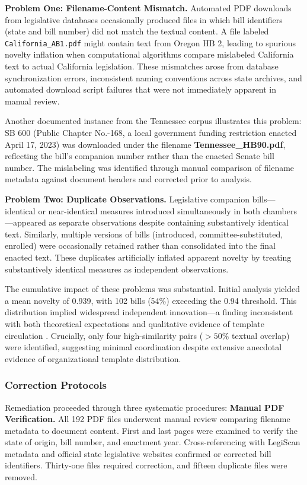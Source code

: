 \textbf{Problem One: Filename-Content Mismatch.} Automated PDF downloads from legislative databases occasionally produced files in which bill identifiers (state and bill number) did not match the textual content. A file labeled \texttt{California\_AB1.pdf} might contain text from Oregon HB 2, leading to spurious novelty inflation when computational algorithms compare mislabeled California text to actual California legislation. These mismatches arose from database synchronization errors, inconsistent naming conventions across state archives, and automated download script failures that were not immediately apparent in manual review.

Another documented instance from the Tennessee corpus illustrates this problem: SB 600 (Public Chapter No.-168, a local government funding restriction enacted April 17, 2023) was downloaded under the filename \textbf{Tennessee\_HB90.pdf}, reflecting the bill's companion number rather than the enacted Senate bill number. The mislabeling was identified through manual comparison of filename metadata against document headers and corrected prior to analysis.

\textbf{Problem Two: Duplicate Observations.} Legislative companion bills---identical or near-identical measures introduced simultaneously in both chambers---appeared as separate observations despite containing substantively identical text. Similarly, multiple versions of bills (introduced, committee-substituted, enrolled) were occasionally retained rather than consolidated into the final enacted text. These duplicates artificially inflated apparent novelty by treating substantively identical measures as independent observations.

The cumulative impact of these problems was substantial. Initial analysis yielded a mean novelty of 0.939, with 102 bills (54\%) exceeding the 0.94 threshold. This distribution implied widespread independent innovation---a finding inconsistent with both theoretical expectations and qualitative evidence of template circulation \parencite{hertel-fernandezStateCapture2019, jansaCopyPasteLawmaking2019}. Crucially, only four high-similarity pairs ($>50\%$ textual overlap) were identified, suggesting minimal coordination despite extensive anecdotal evidence of organizational template distribution.

\subsubsection{Correction Protocols}
Remediation proceeded through three systematic procedures:
\textbf{Manual PDF Verification.} All 192 PDF files underwent manual review comparing filename metadata to document content. First and last pages were examined to verify the state of origin, bill number, and enactment year. Cross-referencing with LegiScan metadata and official state legislative websites confirmed or corrected bill identifiers. Thirty-one files required correction, and fifteen duplicate files were removed.

